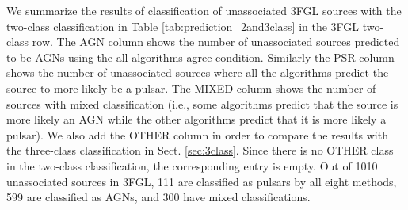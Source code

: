 \documentclass[referee]{aa} %
\begin{document}
\begin{table}[!h]

    \caption{Expected numbers of sources among the unassociated 3FGL and 4FGL-DR2 sources.}
    \label{tab:prediction_2and3class}

\centering
{}
\end{table}

We summarize the results of classification of unassociated 3FGL sources with the two-class classification 
in Table \ref{tab:prediction_2and3class} in the 3FGL two-class row.
The AGN column shows the number of unassociated sources predicted to be AGNs using the all-algorithms-agree condition.
Similarly the PSR column shows the number of unassociated sources where all the algorithms predict the source to more likely be a pulsar.
The MIXED column shows the number of sources with mixed classification (i.e., some algorithms predict that the source is more likely an AGN while the other algorithms predict that it is more likely a pulsar).
We also add the OTHER column in order to compare the results with the three-class classification in Sect. \ref{sec:3class}.
Since there is no OTHER class in the two-class classification, the corresponding entry is empty.
Out of 1010 unassociated sources in 3FGL, 111 are classified as pulsars by all eight methods, 599 are classified as AGNs, and 300 have mixed classifications.
\end{document}
